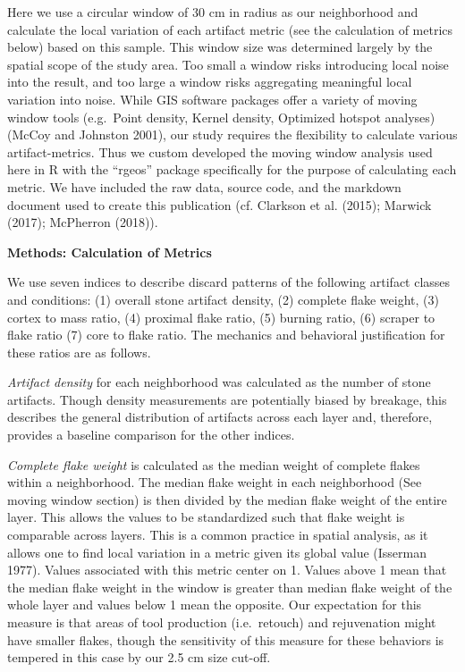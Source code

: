 \documentclass[smallextended]{svjour3}       %
\begin{document}
Here we use a circular window of 30 cm in radius as our neighborhood and
calculate the local variation of each artifact metric (see the
calculation of metrics below) based on this sample. This window size was
determined largely by the spatial scope of the study area. Too small a
window risks introducing local noise into the result, and too large a
window risks aggregating meaningful local variation into noise. While
GIS software packages offer a variety of moving window tools (e.g.~Point
density, Kernel density, Optimized hotspot analyses) (McCoy and Johnston
2001), our study requires the flexibility to calculate various
artifact-metrics. Thus we custom developed the moving window analysis
used here in R with the ``rgeos'' package specifically for the purpose
of calculating each metric. We have included the raw data, source code,
and the markdown document used to create this publication (cf. Clarkson
et al. (2015); Marwick (2017); McPherron (2018)).

\textbf{Methods: Calculation of Metrics}

We use seven indices to describe discard patterns of the following
artifact classes and conditions: (1) overall stone artifact density, (2)
complete flake weight, (3) cortex to mass ratio, (4) proximal flake
ratio, (5) burning ratio, (6) scraper to flake ratio (7) core to flake
ratio. The mechanics and behavioral justification for these ratios are
as follows.

\emph{Artifact density} for each neighborhood was calculated as the
number of stone artifacts. Though density measurements are potentially
biased by breakage, this describes the general distribution of artifacts
across each layer and, therefore, provides a baseline comparison for the
other indices.

\emph{Complete flake weight} is calculated as the median weight of
complete flakes within a neighborhood. The median flake weight in each
neighborhood (See moving window section) is then divided by the median
flake weight of the entire layer. This allows the values to be
standardized such that flake weight is comparable across layers. This is
a common practice in spatial analysis, as it allows one to find local
variation in a metric given its global value (Isserman 1977). Values
associated with this metric center on 1. Values above 1 mean that the
median flake weight in the window is greater than median flake weight of
the whole layer and values below 1 mean the opposite. Our expectation
for this measure is that areas of tool production (i.e.~retouch) and
rejuvenation might have smaller flakes, though the sensitivity of this
measure for these behaviors is tempered in this case by our 2.5 cm size
cut-off.
\end{document}
